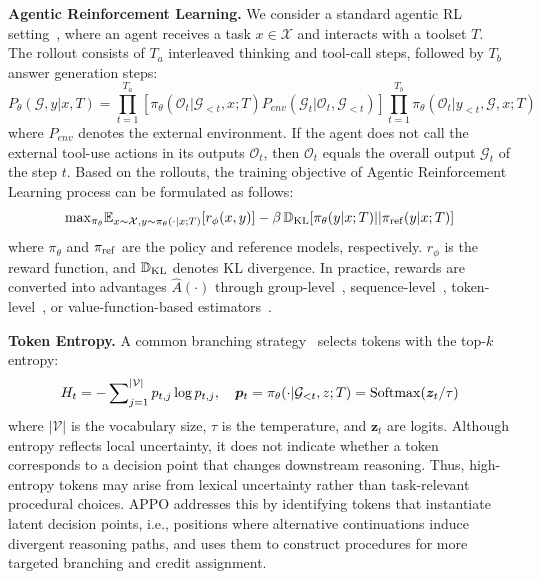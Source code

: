 \documentclass{article}
\begin{document}
\noindent\textbf{Agentic Reinforcement Learning.}
We consider a standard agentic RL setting~\cite{gou2023tora,li2025torl,wu2025agentic,dong2025tool,su2025toolorchestra,qian2025toolrl}, where an agent receives a task $x\in\mathcal{X}$ and interacts with a toolset $T$. The rollout consists of $T_a$ interleaved thinking and tool-call steps, followed by $T_b$ answer generation steps:
\begin{equation}
P_\theta(\mathcal{G},y|x,T)=\prod_{t=1}^{T_a}[\pi_\theta(\mathcal{O}_{t}|\mathcal{G}_{<t},x;T)P_{env}(\mathcal{G}_t|\mathcal{O}_{t},\mathcal{G}_{<t})]\prod_{t=1}^{T_b}\pi_\theta(\mathcal{O}_{t}|y_{<t},\mathcal{G},x;T)
\end{equation}
where $P_{env}$ denotes the external environment. If the agent does not call the external tool-use actions in its outputs $\mathcal{O}_{t}$, then $\mathcal{O}_{t}$ equals the overall output $\mathcal{G}_t$ of the step $t$. Based on the rollouts, the training objective of Agentic Reinforcement Learning process can be formulated as follows:
\begin{equation}
    {\rm max}_{\pi_\theta}\mathbb{E}_{x\sim\mathcal{X},y\sim\pi_\theta(\cdot|x;T)}[r_\phi(x,y)]-\beta\,\mathbb{D}_{\rm KL}[\pi_\theta(y|x;T)||\pi_{\rm ref}(y|x;T)]
\end{equation}
where $\pi_\theta$ and $\pi_{\rm ref}$ are the policy and reference models, respectively. $r_\phi$ is the reward function, and $\mathbb{D}_{\rm KL}$ denotes KL divergence. In practice, rewards are converted into advantages $\hat{A}(\cdot)$ through group-level~\cite{shao2024deepseekmath,guo2025deepseek,liu2025understanding}, sequence-level~\cite{zheng2025group}, token-level~\cite{yu2025dapo}, or value-function-based estimators~\cite{schulman2017proximal}.

\vspace{0.3em}
\noindent\textbf{Token Entropy.}
A common branching strategy~\cite{dong2025agentic,dong2025agentic1,hou2025treerl} selects tokens with the top-$k$ entropy:
\begin{equation}
    H_t=-\sum\nolimits_{j=1}^{|\mathcal{V}|}p_{t,j}\log p_{t,j}, \quad \bm{p}_t=\pi_\theta(\cdot|\mathcal{G}_{<t},z;T)={\rm Softmax}(\bm{z}_t/\tau)
\end{equation}
where $|\mathcal{V}|$ is the vocabulary size, $\tau$ is the temperature, and $\bm{z}_t$ are logits. Although entropy reflects local uncertainty, it does not indicate whether a token corresponds to a decision point that changes downstream reasoning. Thus, high-entropy tokens may arise from lexical uncertainty rather than task-relevant procedural choices. APPO addresses this by identifying tokens that instantiate latent decision points, i.e., positions where alternative continuations induce divergent reasoning paths, and uses them to construct procedures for more targeted branching and credit assignment.
\end{document}
